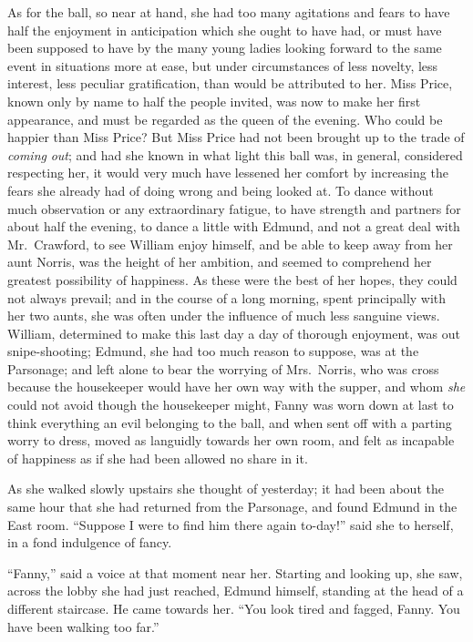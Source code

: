 As for the ball, so near at hand, she had too many
agitations and fears to have half the enjoyment in
anticipation which she ought to have had, or must have
been supposed to have by the many young ladies looking
forward to the same event in situations more at ease,
but under circumstances of less novelty, less interest,
less peculiar gratification, than would be attributed
to her.  Miss Price, known only by name to half the
people invited, was now to make her first appearance,
and must be regarded as the queen of the evening.
Who could be happier than Miss Price?  But Miss Price
had not been brought up to the trade of \emph{coming} \emph{out};
and had she known in what light this ball was, in general,
considered respecting her, it would very much have lessened
her comfort by increasing the fears she already had of doing
wrong and being looked at.  To dance without much observation
or any extraordinary fatigue, to have strength and partners
for about half the evening, to dance a little with Edmund,
and not a great deal with Mr.\ Crawford, to see William
enjoy himself, and be able to keep away from her aunt Norris,
was the height of her ambition, and seemed to comprehend
her greatest possibility of happiness.  As these were
the best of her hopes, they could not always prevail;
and in the course of a long morning, spent principally
with her two aunts, she was often under the influence
of much less sanguine views.  William, determined to
make this last day a day of thorough enjoyment,
was out snipe-shooting; Edmund, she had too much reason
to suppose, was at the Parsonage; and left alone to bear
the worrying of Mrs.\ Norris, who was cross because the
housekeeper would have her own way with the supper,
and whom \emph{she} could not avoid though the housekeeper might,
Fanny was worn down at last to think everything an evil
belonging to the ball, and when sent off with a parting worry
to dress, moved as languidly towards her own room, and felt
as incapable of happiness as if she had been allowed no share in
it.

As she walked slowly upstairs she thought of yesterday;
it had been about the same hour that she had returned
from the Parsonage, and found Edmund in the East room.
``Suppose I were to find him there again to-day!'' said she
to herself, in a fond indulgence of fancy.

``Fanny,'' said a voice at that moment near her.
Starting and looking up, she saw, across the lobby she
had just reached, Edmund himself, standing at the head
of a different staircase.  He came towards her.  ``You look
tired and fagged, Fanny.  You have been walking too far.''

